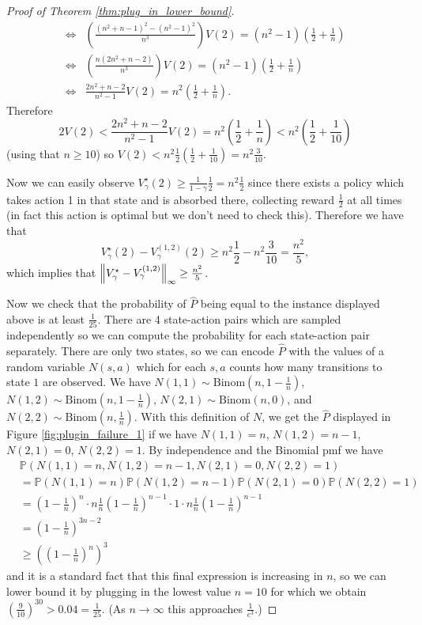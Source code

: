 \documentclass{article}
\theoremstyle{plain}
\theoremstyle{plain}
\theoremstyle{remark}
\theoremstyle{plain}
\theoremstyle{plain}
\renewcommand{\P}{\mathbb{P}}
\newcommand{\Phat}{\widehat{P}}
\begin{document}
\begin{proof}[Proof of Theorem \ref{thm:plug_in_lower_bound}]
\begin{align*}
    \iff & \left(\frac{(n^2 + n - 1)^2 - (n^2 - 1)^2}{n^3}\right) V(2) = (n^2 - 1) \left( \frac{1}{2} + \frac{1}{n}\right) \\
    \iff & \left(\frac{n(2n^2 + n - 2)}{n^3}\right) V(2) = (n^2 - 1) \left( \frac{1}{2} + \frac{1}{n}\right) \\
    \iff & \frac{2n^2 + n - 2}{n^2 - 1}V(2) = n^2 \left( \frac{1}{2} + \frac{1}{n}\right).
\end{align*}
Therefore
\[
2 V(2) < \frac{2n^2 + n - 2}{n^2 - 1}V(2) = n^2 \left( \frac{1}{2} + \frac{1}{n}\right) < n^2 \left( \frac{1}{2} + \frac{1}{10}\right)
\]
(using that $n \geq 10$) so $V(2) < n^2\frac{1}{2}\left( \frac{1}{2} + \frac{1}{10}\right) = n^2\frac{3}{10}$.

Now we can easily observe $V^\star_\gamma(2) \geq \frac{1}{1-\gamma}\frac{1}{2} = n^2 \frac{1}{2}$ since there exists a policy which takes action 1 in that state and is absorbed there, collecting reward $\frac{1}{2}$ at all times (in fact this action is optimal but we don't need to check this). Therefore we have that
\[
    V^\star_\gamma(2) - V^{(1,2)}_\gamma(2) \geq n^2\frac{1}{2} - n^2\frac{3}{10} = \frac{n^2}{5},
\]
which implies that $\left\Vert V^\star_\gamma - V^{(1,2)}_\gamma\right\Vert _{\infty} \geq \frac{n^2}{5}$.

Now we check that the probability of $\Phat$ being equal to the instance displayed above is at least $\frac{1}{25}$. There are 4 state-action pairs which are sampled independently so we can compute the probability for each state-action pair separately. There are only two states, so we can encode $\Phat$ with the values of a random variable $N(s,a)$ which for each $s,a$ counts how many transitions to state $1$ are observed. We have $N(1,1) \sim \text{Binom}(n, 1-\frac{1}{n})$, $N(1,2) \sim \text{Binom}(n, 1-\frac{1}{n})$, $N(2,1) \sim \text{Binom}(n, 0)$, and $N(2,2) \sim \text{Binom}(n, \frac{1}{n})$. With this definition of $N$, we get the $\Phat$ displayed in Figure \ref{fig:plugin_failure_1} if we have $N(1,1) = n$, $N(1,2) = n-1$, $N(2,1) = 0$, $N(2,2) = 1$. By independence and the Binomial pmf we have
\begin{align*}
    &\P\left(N(1,1) = n, N(1,2) = n-1, N(2,1) = 0, N(2,2) = 1 \right) \\
    &= \P(N(1,1) = n) \P(N(1,2) = n-1) \P(N(2,1) = 0) \P(N(2,2) = 1) \\
    &= \left(1-\frac{1}{n} \right)^n \cdot n \frac{1}{n} \left(1-\frac{1}{n} \right)^{n-1} \cdot 1 \cdot n \frac{1}{n} \left(1-\frac{1}{n} \right)^{n-1} \\
    &= \left(1-\frac{1}{n} \right)^{3n-2} \\
    & \geq \left(\left(1-\frac{1}{n} \right)^n\right)^3
\end{align*}
and it is a standard fact that this final expression is increasing in $n$, so we can lower bound it by plugging in the lowest value $n=10$ for which we obtain $\left(\frac{9}{10} \right)^{30} > 0.04 = \frac{1}{25}$. (As $n \to \infty$ this approaches $\frac{1}{e^3}$.)


\end{proof}
\end{document}
